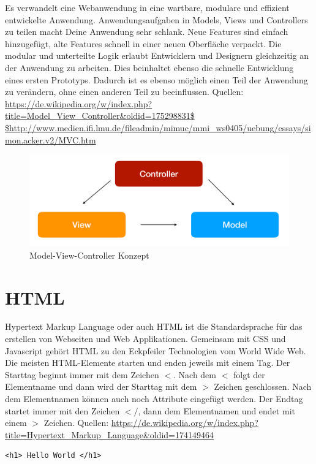 Es verwandelt eine Webanwendung in eine wartbare, modulare und effizient entwickelte Anwendung. 
Anwendungsaufgaben in Models, Views und Controllers zu teilen macht Deine Anwendung sehr schlank. 
Neue Features sind einfach hinzugefügt, alte Features schnell in einer neuen Oberfläche verpackt. 
Die modular und unterteilte Logik erlaubt Entwicklern und Designern gleichzeitig an der Anwendung zu arbeiten. 
Dies beinhaltet ebenso die schnelle Entwicklung eines ersten Prototyps. 
Dadurch ist es ebenso möglich einen Teil der Anwendung zu verändern, ohne einen anderen Teil zu beeinflussen.
Quellen: \cite{_model_2018} \cite{_model-view-controller_????} \url{https://de.wikipedia.org/w/index.php?title=Model_View_Controller&oldid=175298831$ $http://www.medien.ifi.lmu.de/fileadmin/mimuc/mmi_ws0405/uebung/essays/simon.acker.v2/MVC.htm}
\begin{figure}[H]
\begin{center}
	\includegraphics[scale=.4]{images/MVC.png}
\end{center}
	\caption{Model-View-Controller Konzept}
	\label{fig:sample}
\end{figure}



\section{HTML}
Hypertext Markup Language oder auch HTML ist die Standardsprache für das erstellen von Webseiten und Web Applikationen. Gemeinsam mit CSS und Javascript gehört HTML zu den Eckpfeiler Technologien vom World Wide Web.
Die meisten HTML-Elemente starten und enden jeweils mit einem Tag. Der Starttag beginnt immer mit dem Zeichen $<$. Nach dem $<$ folgt der Elementname und dann wird der Starttag mit dem $>$ Zeichen geschlossen. Nach dem Elementnamen können auch noch Attribute eingefügt werden.
Der Endtag startet immer mit den Zeichen $</$, dann dem Elementnamen und endet mit einem $>$ Zeichen.
Quellen: \cite{_hypertext_2018} \url{https://de.wikipedia.org/w/index.php?title=Hypertext_Markup_Language&oldid=174149464}
\begin{lstlisting}
<h1> Hello World </h1>
\end{lstlisting}

